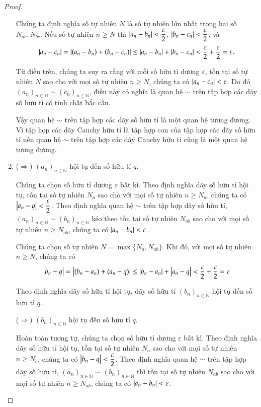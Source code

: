 \begin{proof}
\begin{enumerate}[label={(\roman*)},itemsep=0pt]
              Chúng ta định nghĩa số tự nhiên $N$ là số tự nhiên lớn nhất trong hai số $N_{ab}, N_{bc}$. Nếu số tự nhiên $n\geq N$ thì $\left\vert{a_{n} - b_{n}}\right\vert < \dfrac{\varepsilon}{2}$, $\left\vert{b_{n} - c_{n}}\right\vert < \dfrac{\varepsilon}{2}$, và
              \[
                  \left\vert{a_{n} - c_{n}}\right\vert = \left\vert{(a_{n} - b_{n}) + (b_{n} - c_{n})}\right\vert \leq \left\vert{a_{n} - b_{n}}\right\vert + \left\vert{b_{n} - c_{n}}\right\vert < \dfrac{\varepsilon}{2} + \dfrac{\varepsilon}{2} = \varepsilon.
              \]

              Từ điều trên, chúng ta suy ra rằng với mỗi số hữu tỉ dương $\varepsilon$, tồn tại số tự nhiên $N$ sao cho với mọi số tự nhiên $n\geq N$, chúng ta có $ \left\vert{a_{n} - c_{n}}\right\vert < \varepsilon$. Do đó ${(a_{n})}_{n\in\mathbb{N}} \sim {(c_{n})}_{n\in\mathbb{N}}$, điều này có nghĩa là quan hệ $\sim$ trên tập hợp các dãy số hữu tỉ có tính chất bắc cầu.

              Vậy quan hệ $\sim$ trên tập hợp các dãy số hữu tỉ là một quan hệ tương đương. Vì tập hợp các dãy Cauchy hữu tỉ là tập hợp con của tập hợp các dãy số hữu tỉ nên quan hệ $\sim$ trên tập hợp các dãy Cauchy hữu tỉ cũng là một quan hệ tương đương.
        \item ($\Rightarrow$) ${(a_{n})}_{n\in\mathbb{N}}$ hội tụ đến số hữu tỉ $q$.

              Chúng ta chọn số hữu tỉ dương $\varepsilon$ bất kì. Theo định nghĩa dãy số hữu tỉ hội tụ, tồn tại số tự nhiên $N_{a}$ sao cho với mọi số tự nhiên $n\geq N_{a}$, chúng ta có $\left\vert{a_{n} - q}\right\vert < \dfrac{\varepsilon}{2}$. Theo định nghĩa quan hệ $\sim$ trên tập hợp dãy số hữu tỉ, ${(a_{n})}_{n\in\mathbb{N}}\sim {(b_{n})}_{n\in\mathbb{N}}$ kéo theo tồn tại số tự nhiên $N_{ab}$ sao cho với mọi số tự nhiên $n\geq N_{ab}$, chúng ta có $\left\vert{a_{n} - b_{n}}\right\vert < \varepsilon$.

              Chúng ta chọn số tự nhiên $N = \max\{ N_{a}, N_{ab} \}$. Khi đó, với mọi số tự nhiên $n\geq N$, chúng ta có
              \[
                  \left\vert{b_{n} - q}\right\vert = \left\vert{(b_{n} - a_{n}) + (a_{n} - q)}\right\vert \leq \left\vert{b_{n} - a_{n}}\right\vert + \left\vert{a_{n} - q}\right\vert < \frac{\varepsilon}{2} + \frac{\varepsilon}{2} = \varepsilon
              \]

              Theo định nghĩa dãy số hữu tỉ hội tụ, dãy số hữu tỉ ${(b_{n})}_{n\in\mathbb{N}}$ hội tụ đến số hữu tỉ $q$.

              ($\Rightarrow$) ${(b_{n})}_{n\in\mathbb{N}}$ hội tụ đến số hữu tỉ $q$.

              Hoàn toàn tương tự, chúng ta chọn số hữu tỉ dương $\varepsilon$ bất kì. Theo định nghĩa dãy số hữu tỉ hội tụ, tồn tại số tự nhiên $N_{a}$ sao cho với mọi số tự nhiên $n\geq N_{b}$, chúng ta có $\left\vert{b_{n} - q}\right\vert < \dfrac{\varepsilon}{2}$. Theo định nghĩa quan hệ $\sim$ trên tập hợp dãy số hữu tỉ, ${(a_{n})}_{n\in\mathbb{N}}\sim {(b_{n})}_{n\in\mathbb{N}}$ thì tồn tại số tự nhiên $N_{ab}$ sao cho với mọi số tự nhiên $n\geq N_{ab}$, chúng ta có $\left\vert{a_{n} - b_{n}}\right\vert < \varepsilon$.


\end{enumerate}
\end{proof}

